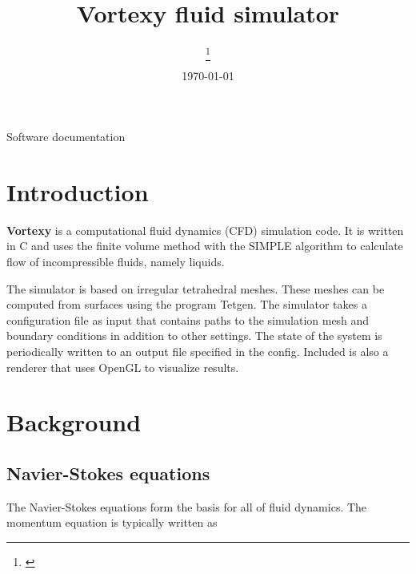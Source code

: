 \documentclass[12pt]{article}
\title {
  Vortexy fluid simulator
}
\date{\today}
\author[1] {
  \firstauth\thanks{\href{mailto: \email}{\email}}
}
\begin{document}
\setlength{\belowcaptionskip}{10pt}


\normalsize

\begin{titlingpage}
  \maketitle

  \begin{center}
    Software documentation
  \end{center}
\end{titlingpage}

\newpage

\tableofcontents

\newpage

\section{Introduction}

{\bf Vortexy} is a computational fluid dynamics (CFD) simulation code. It is written in C and uses the finite volume method with the SIMPLE algorithm to calculate flow of incompressible fluids, namely liquids.

The simulator is based on irregular tetrahedral meshes. These meshes can be computed from surfaces using the program Tetgen. The simulator takes a configuration file as input that contains paths to the simulation mesh and boundary conditions in addition to other settings. The state of the system is periodically written to an output file specified in the config. Included is also a renderer that uses OpenGL to visualize results.

\section{Background}

\subsection{Navier-Stokes equations}

\noindent

The Navier-Stokes equations form the basis for all of fluid dynamics. The momentum equation is typically written as \cite[p.~59]{tri}
\end{document}
